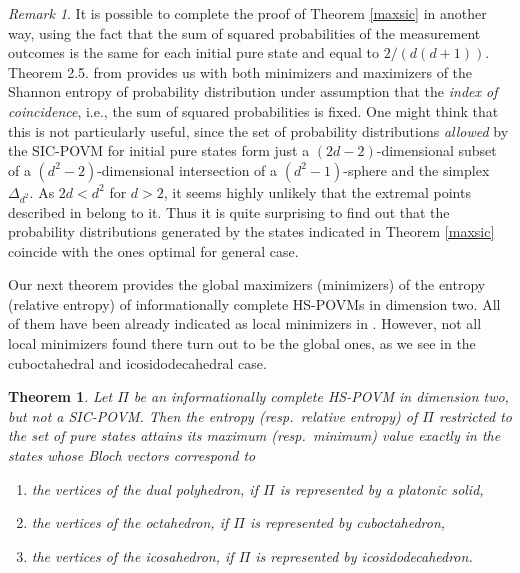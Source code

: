 \documentclass[11pt]{article}
\newtheorem{Th}{Theorem}
\theoremstyle{remark}
\newtheorem{R}{Remark}
\theoremstyle{definition}
\begin{document}
\begin{R}
	It is possible to complete the proof of Theorem \ref{maxsic} in another way, using the fact that the sum of squared probabilities of the measurement outcomes is the same for each initial pure state and equal to $2/(d(d+1))$. Theorem 2.5. from \cite{HarTop01} provides us with both minimizers and maximizers of the Shannon entropy of probability distribution under assumption that the \emph{index of coincidence}, i.e., the sum of squared probabilities is fixed. One might think that this is not particularly useful, since the set of  probability distributions \emph{allowed} by the SIC-POVM for initial pure states form just a $(2d-2)$-dimensional subset of a $(d^2-2)$-dimensional intersection of a $(d^2-1)$-sphere and the simplex $\Delta_{d^2}$. As $2d<d^2$ for $d>2$, it seems highly unlikely that the extremal points described in \cite{HarTop01}  belong to it. Thus it is quite surprising to find out that the probability distributions generated by the states indicated in Theorem \ref{maxsic} coincide with the ones optimal for general case.
\end{R}



Our next theorem provides the global maximizers (minimizers) of the entropy (relative entropy) of informationally complete HS-POVMs in dimension two. All of them have been already indicated as local minimizers in \cite[Proposition 8]{SloSzy16}. However, not all local minimizers found there turn out to be the global ones, as we see in the cuboctahedral and icosidodecahedral case.

\begin{Th}\label{HSThm}
	Let $\Pi$ be an informationally complete HS-POVM in dimension two, but not a SIC-POVM.  Then the entropy (resp.\ relative entropy) of $\Pi$  restricted to the set of pure states attains its maximum (resp.\ minimum) value exactly in the states whose Bloch vectors correspond to 
	\begin{enumerate}[1\emph{)}]
		\item the vertices of the dual polyhedron, if $\Pi$ is represented by a platonic solid,\label{platonic}
		\item the vertices of the octahedron, if $\Pi$ is represented by cuboctahedron,
		\item the vertices of the icosahedron, if $\Pi$ is represented by icosidodecahedron.
	\end{enumerate}
\end{Th}
\end{document}
